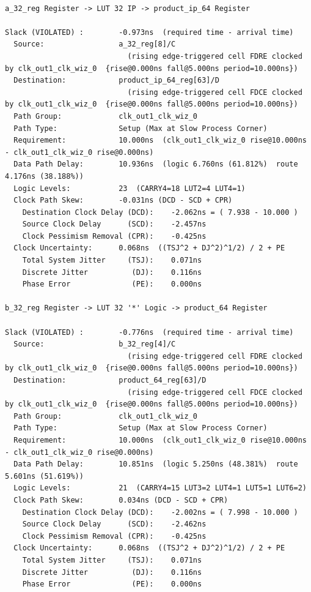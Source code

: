 \documentclass{report}
\begin{document}
\begin{verbatim}

a_32_reg Register -> LUT 32 IP -> product_ip_64 Register

Slack (VIOLATED) :        -0.973ns  (required time - arrival time)
  Source:                 a_32_reg[8]/C
                            (rising edge-triggered cell FDRE clocked by clk_out1_clk_wiz_0  {rise@0.000ns fall@5.000ns period=10.000ns})
  Destination:            product_ip_64_reg[63]/D
                            (rising edge-triggered cell FDCE clocked by clk_out1_clk_wiz_0  {rise@0.000ns fall@5.000ns period=10.000ns})
  Path Group:             clk_out1_clk_wiz_0
  Path Type:              Setup (Max at Slow Process Corner)
  Requirement:            10.000ns  (clk_out1_clk_wiz_0 rise@10.000ns - clk_out1_clk_wiz_0 rise@0.000ns)
  Data Path Delay:        10.936ns  (logic 6.760ns (61.812%)  route 4.176ns (38.188%))
  Logic Levels:           23  (CARRY4=18 LUT2=4 LUT4=1)
  Clock Path Skew:        -0.031ns (DCD - SCD + CPR)
    Destination Clock Delay (DCD):    -2.062ns = ( 7.938 - 10.000 ) 
    Source Clock Delay      (SCD):    -2.457ns
    Clock Pessimism Removal (CPR):    -0.425ns
  Clock Uncertainty:      0.068ns  ((TSJ^2 + DJ^2)^1/2) / 2 + PE
    Total System Jitter     (TSJ):    0.071ns
    Discrete Jitter          (DJ):    0.116ns
    Phase Error              (PE):    0.000ns

b_32_reg Register -> LUT 32 '*' Logic -> product_64 Register

Slack (VIOLATED) :        -0.776ns  (required time - arrival time)
  Source:                 b_32_reg[4]/C
                            (rising edge-triggered cell FDRE clocked by clk_out1_clk_wiz_0  {rise@0.000ns fall@5.000ns period=10.000ns})
  Destination:            product_64_reg[63]/D
                            (rising edge-triggered cell FDCE clocked by clk_out1_clk_wiz_0  {rise@0.000ns fall@5.000ns period=10.000ns})
  Path Group:             clk_out1_clk_wiz_0
  Path Type:              Setup (Max at Slow Process Corner)
  Requirement:            10.000ns  (clk_out1_clk_wiz_0 rise@10.000ns - clk_out1_clk_wiz_0 rise@0.000ns)
  Data Path Delay:        10.851ns  (logic 5.250ns (48.381%)  route 5.601ns (51.619%))
  Logic Levels:           21  (CARRY4=15 LUT3=2 LUT4=1 LUT5=1 LUT6=2)
  Clock Path Skew:        0.034ns (DCD - SCD + CPR)
    Destination Clock Delay (DCD):    -2.002ns = ( 7.998 - 10.000 ) 
    Source Clock Delay      (SCD):    -2.462ns
    Clock Pessimism Removal (CPR):    -0.425ns
  Clock Uncertainty:      0.068ns  ((TSJ^2 + DJ^2)^1/2) / 2 + PE
    Total System Jitter     (TSJ):    0.071ns
    Discrete Jitter          (DJ):    0.116ns
    Phase Error              (PE):    0.000ns


\end{verbatim}
\end{document}
